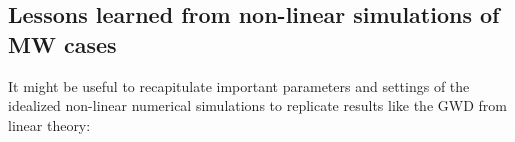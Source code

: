 


\subsection*{Lessons learned from non-linear simulations of MW cases}
It might be useful to recapitulate important parameters and settings of the idealized non-linear numerical simulations to replicate results like the GWD from linear theory:

